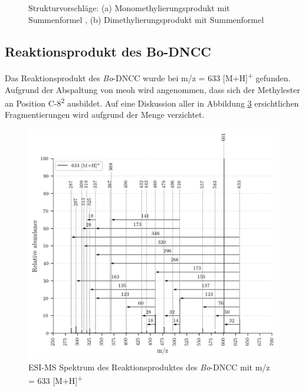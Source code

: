 \begin{figure}[!htbp]
\begin{subfigure}[b]{0.5\textwidth}
    \caption{}
    \label{fig:645MHStruktur}
  \end{subfigure}
  \caption[Strukturvorschläge für das Mono- und Dimethylierungsprodukt des \textit{Bo}-DYCC, Quelle: Autor]{Strukturvorschläge: (a) Monomethylierungsprodukt mit Summenformel , (b) Dimethylierungsprodukt mit Summenformel }
\end{figure}

\subsection{Reaktionsprodukt des Bo-DNCC}

Das Reaktionsprodukt des \textit{Bo}-DNCC wurde bei m/z = 633 [M+H]\textsuperscript{+} gefunden. Aufgrund der Abspaltung von \gls{meoh} wird angenommen, dass sich der Methylester an Position C-8\textsuperscript{2} ausbildet. Auf eine Diskussion aller in Abbildung \ref{fig:633MH} ersichtlichen Fragmentierungen wird aufgrund der Menge verzichtet.

\begin{figure}[!htbp]
  \centering
  \includegraphics[width=\textwidth, height=0.7\textwidth]{figures/Kapitel7/Kataboliten/VWA_MS_633.png}
  \caption[ESI-MS Spektrum des Reaktionsproduktes des \textit{Bo}-DNCC, Quelle: Autor]{ESI-MS Spektrum des Reaktionsproduktes des \textit{Bo}-DNCC mit m/z = 633 [M+H]\textsuperscript{+}}
  \label{fig:633MH}
\end{figure}

